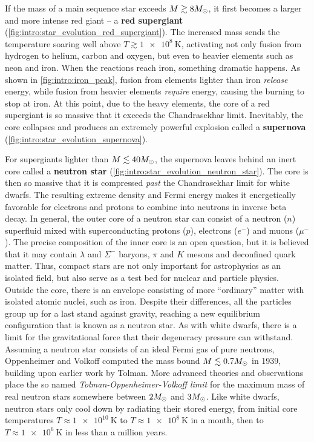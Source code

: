 If the mass of a main sequence star exceeds $M \gtrsim 8 M_\odot$, it first becomes a larger and more intense red giant -- a \textbf{red supergiant} (\cref{fig:intro:star_evolution_red_supergiant}).
The increased mass sends the temperature soaring well above $T \gtrsim \SI{1e8}{\kelvin}$, activating not only fusion from hydrogen to helium, carbon and oxygen, but even to heavier elements such as neon and iron.
When the reactions reach iron, something dramatic happens.
As shown in \cref{fig:intro:iron_peak}, fusion from elements lighter than iron \emph{release} energy, while fusion from heavier elements \emph{require} energy, causing the burning to stop at iron.
At this point, due to the heavy elements, the core of a red supergiant is so massive that it exceeds the Chandrasekhar limit.
Inevitably, the core collapses and produces an extremely powerful explosion called a \textbf{supernova} (\cref{fig:intro:star_evolution_supernova}).

For supergiants lighter than $M \lesssim 40 M_\odot$, the supernova leaves behind an inert core called a \textbf{neutron star} (\cref{fig:intro:star_evolution_neutron_star}).
The core is then so massive that it is compressed \emph{past} the Chandrasekhar limit for white dwarfs.
The resulting extreme density and Fermi energy makes it energetically favorable for electrons and protons to combine into neutrons in inverse beta decay.
In general, the outer core of a neutron star can consist of a neutron ($n$) superfluid mixed with superconducting protons ($p$), electrons ($e^-$) and muons ($\mu^-$). %
The precise composition of the inner core is an open question, but it is believed that it may contain $\lambda$ and $\Sigma^-$ baryons, $\pi$ and $K$ mesons and deconfined quark matter. \cite{ref:neutron_star_physics} %
Thus, compact stars are not only important for astrophysics as an isolated field, but also serve as a test bed for nuclear and particle physics.
Outside the core, there is an envelope consisting of more ``ordinary'' matter with isolated atomic nuclei, such as iron. %
Despite their differences, all the particles group up for a last stand against gravity, reaching a new equilibrium configuration that is known as a neutron star.
As with white dwarfs, there is a limit for the gravitational force that their degeneracy pressure can withstand.
Assuming a neutron star consists of an ideal Fermi gas of pure neutrons, Oppenheimer and Volkoff computed the mass bound $M \lesssim 0.7 M_\odot$ in 1939, building upon earlier work by Tolman. \cite{ref:tov,ref:tolman}
More advanced theories and observations place the so named \emph{Tolman-Oppenheimer-Volkoff limit} for the maximum mass of real neutron stars somewhere between $2 M_\odot$ and $3 M_\odot$. %
Like white dwarfs, neutron stars only cool down by radiating their stored energy, from initial core temperatures $T \approx \SI{1e10}{\kelvin}$ to $T \approx \SI{1e8}{\kelvin}$ in a month, then to $T \approx \SI{1e6}{\kelvin}$ in less than a million years. \cite{ref:glendenning} %

